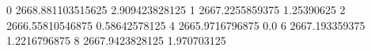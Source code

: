 0 2668.881103515625 2.909423828125
1 2667.2255859375 1.25390625
2 2666.55810546875 0.58642578125
4 2665.9716796875 0.0
6 2667.193359375 1.2216796875
8 2667.9423828125 1.970703125

